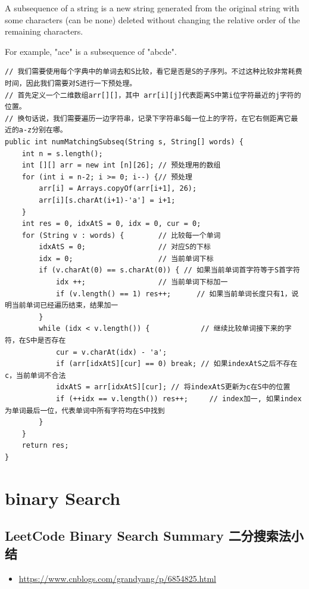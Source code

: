 \documentclass[9pt, b5paper]{article}
\begin{document}
A subsequence of a string is a new string generated from the original string with some characters (can be none) deleted without changing the relative order of the remaining characters.

For example, "ace" is a subsequence of "abcde".
\begin{verbatim}
// 我们需要使用每个字典中的单词去和S比较，看它是否是S的子序列。不过这种比较非常耗费时间，因此我们需要对S进行一下预处理。
// 首先定义一个二维数组arr[][]，其中 arr[i][j]代表距离S中第i位字符最近的j字符的位置。
// 换句话说，我们需要遍历一边字符串，记录下字符串S每一位上的字符，在它右侧距离它最近的a-z分别在哪。
public int numMatchingSubseq(String s, String[] words) {
    int n = s.length();
    int [][] arr = new int [n][26]; // 预处理用的数组
    for (int i = n-2; i >= 0; i--) {// 预处理
        arr[i] = Arrays.copyOf(arr[i+1], 26);
        arr[i][s.charAt(i+1)-'a'] = i+1;
    }
    int res = 0, idxAtS = 0, idx = 0, cur = 0;
    for (String v : words) {        // 比较每一个单词
        idxAtS = 0;                 // 对应S的下标
        idx = 0;                    // 当前单词下标
        if (v.charAt(0) == s.charAt(0)) { // 如果当前单词首字符等于S首字符
            idx ++;                 // 当前单词下标加一
            if (v.length() == 1) res++;      // 如果当前单词长度只有1，说明当前单词已经遍历结束，结果加一
        }
        while (idx < v.length()) {            // 继续比较单词接下来的字符，在S中是否存在
            cur = v.charAt(idx) - 'a';
            if (arr[idxAtS][cur] == 0) break; // 如果indexAtS之后不存在c，当前单词不合法
            idxAtS = arr[idxAtS][cur]; // 将indexAtS更新为c在S中的位置
            if (++idx == v.length()) res++;     // index加一, 如果index为单词最后一位，代表单词中所有字符均在S中找到
        }
    }
    return res;
}
\end{verbatim}


\section{binary Search}
\label{sec-14}
\subsection{LeetCode Binary Search Summary 二分搜索法小结}
\label{sec-14-1}
\begin{itemize}
\item \url{https://www.cnblogs.com/grandyang/p/6854825.html}
\end{itemize}
\end{document}
